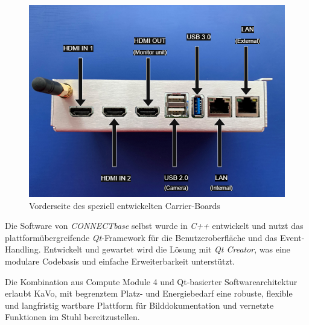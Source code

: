 \begin{figure}[H]
  \centering
  \begin{minipage}[b]{0.82\textwidth}
    \centering
    \includegraphics[width=\textwidth]{images/connectbaseport2.drawio.png}
  \end{minipage}
  \hspace{0.05\textwidth}
  \caption{Vorderseite des speziell entwickelten Carrier-Boards}
  \label{fig:CarrierBoardVorderseite}
\end{figure}
\vspace{1em}

Die Software von \textit{CONNECTbase} selbst wurde in \textit{C++} entwickelt und nutzt das plattformübergreifende \textit{Qt}-Framework für die Benutzeroberfläche und das Event-Handling. Entwickelt und gewartet wird die Lösung mit \textit{Qt Creator}, was eine modulare Codebasis und einfache Erweiterbarkeit unterstützt.

Die Kombination aus Compute Module 4 und Qt-basierter Softwarearchitektur erlaubt KaVo, mit begrenztem Platz- und Energiebedarf eine robuste, flexible und langfristig wartbare Plattform für Bilddokumentation und vernetzte Funktionen im Stuhl bereitzustellen.
